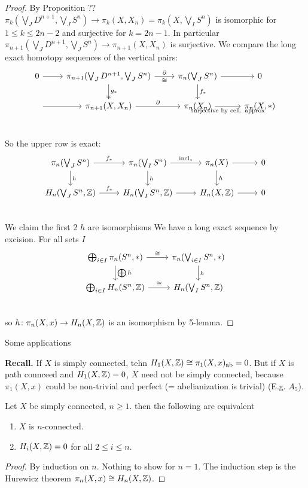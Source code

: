 \documentclass[language=english]{TemplateLecture}
\begin{document}
\begin{proof}
    By Proposition ?? \(\pi_k(\bigvee_J D^{n+1}, \bigvee_J S^n) \to \pi_k(X, X_n) = \pi_k(X, \bigvee_I S^n)\) is isomorphic for \(1 \leq k \leq 2n-2\) and surjective for \(k = 2n-1\). In particular \(\pi_{n+1}(\bigvee_J D^{n+1}, \bigvee_J S^n)\to \pi_{n+1}(X,X_n)\) is surjective. We compare the long exact homotopy sequences of the vertical pairs:
    \[\begin{tikzcd}
        0 \ar[r] & \pi_{n+1}(\bigvee_J D^{n+1}, \bigvee_J S^n)\ar[r, "\partial", "\cong"']\ar[d, "g_*", two heads] & \pi_n(\bigvee_J S^n) \ar[r] \ar[d, "f_*"] & 0 \\
        \phantom 0 \ar[r] & \pi_{n+1}(X, X_n) \ar[r, "\partial"] & \pi_n(X_n) \ar[r, "\text{surjective by cell. approx}"'] & \pi_n(X,*) \\
    \end{tikzcd}\]

    So the upper row is exact:
    \[\begin{tikzcd}
        \pi_n(\bigvee_J S^n) \ar[d, "h"] \ar[r, "f_*"] & \pi_n(\bigvee_I S^n) \ar[d, "h"] \ar[r, "\incl_*"] & \pi_n(X) \ar[r] \ar[d, "h"] & 0 \\
        H_n(\bigvee_J S^n, \iz) \ar[r, "f_*"] & H_n(\bigvee_I S^n, \iz) \ar[r] & H_n(X,\iz) \ar[r] & 0 \\
    \end{tikzcd}\]
    We claim the first 2 \(h\) are isomorphisms We have  a long exact sequence by excision. For all sets \(I\)
    \[\begin{tikzcd}
        \bigoplus_{i\in I} \pi_n(S^n, *) \ar[r, "\cong"] \ar[d, "\bigoplus h"] & \pi_n(\bigvee_{i\in I} S^n, *) \ar[d, "h"] \\
        \bigoplus_{i\in I} H_n(S^n, \iz) \ar[r, "\cong"] & H_n(\bigvee_I S^n, \iz) \\
    \end{tikzcd}\]
    so \(h\colon \pi_n(X,x) \to H_n(X, \mathbb{Z})\) is an isomorphism by 5-lemma.
\end{proof}

Some applications

\textbf{Recall.} If \(X\) is simply connected, tehn \(H_1(X,\mathbb{Z})\cong \pi_1(X,x)_{\mathrm{ab}} = 0\). But if \(X\) is path connceed and \(H_1(X,\mathbb{Z}) = 0\), \(X\) need not be simply connected, because \(\pi_1(X,x)\) could be non-trivial and perfect (= abelianization is trivial) (E.g. \(A_5\)).

\begin{proposition}
    Let \(X\) be simply connected, \(n \geq 1\). then the following are equivalent
    \begin{enumerate}
        \item \(X\) is \(n\)-connected.
        \item \(H_i(X,\mathbb{Z}) = 0\) for all \(2 \leq i \leq n\).
    \end{enumerate}
\end{proposition}
\begin{proof}
    By induction on \(n\). Nothing to show for \(n=1\). The induction step is the Hurewicz theorem \(\pi_n(X,x) \cong H_n(X,\mathbb{Z})\).
\end{proof}
\end{document}
